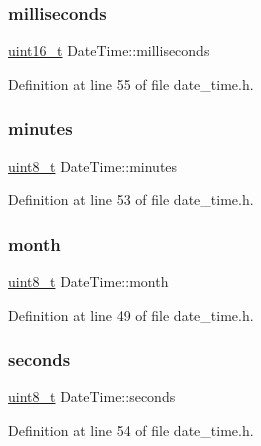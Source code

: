 \subsubsection{\texorpdfstring{milliseconds}{milliseconds}}
{\footnotesize\ttfamily \hyperlink{stdint_8h_a273cf69d639a59973b6019625df33e30}{uint16\+\_\+t} Date\+Time\+::milliseconds}



Definition at line 55 of file date\+\_\+time.\+h.

\mbox{\label{structDateTime_a9e705a28fc51e333616553313107d579}} 
\subsubsection{\texorpdfstring{minutes}{minutes}}
{\footnotesize\ttfamily \hyperlink{stdint_8h_aba7bc1797add20fe3efdf37ced1182c5}{uint8\+\_\+t} Date\+Time\+::minutes}



Definition at line 53 of file date\+\_\+time.\+h.

\mbox{\label{structDateTime_ac895afb51c74941c50205f746b709148}} 
\subsubsection{\texorpdfstring{month}{month}}
{\footnotesize\ttfamily \hyperlink{stdint_8h_aba7bc1797add20fe3efdf37ced1182c5}{uint8\+\_\+t} Date\+Time\+::month}



Definition at line 49 of file date\+\_\+time.\+h.

\mbox{\label{structDateTime_a428828f757146b36432b4669e8b27eeb}} 
\subsubsection{\texorpdfstring{seconds}{seconds}}
{\footnotesize\ttfamily \hyperlink{stdint_8h_aba7bc1797add20fe3efdf37ced1182c5}{uint8\+\_\+t} Date\+Time\+::seconds}



Definition at line 54 of file date\+\_\+time.\+h.

